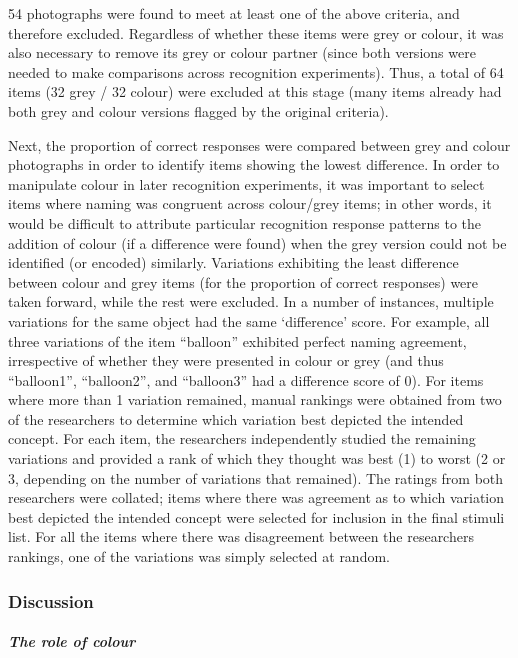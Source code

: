 \documentclass[
  11pt,
]{article}
\begin{document}
54 photographs were found to meet at least one of the above criteria,
and therefore excluded. Regardless of whether these items were grey or
colour, it was also necessary to remove its grey or colour partner
(since both versions were needed to make comparisons across recognition
experiments). Thus, a total of 64 items (32 grey / 32 colour) were
excluded at this stage (many items already had both grey and colour
versions flagged by the original criteria).

Next, the proportion of correct responses were compared between grey and
colour photographs in order to identify items showing the lowest
difference. In order to manipulate colour in later recognition
experiments, it was important to select items where naming was congruent
across colour/grey items; in other words, it would be difficult to
attribute particular recognition response patterns to the addition of
colour (if a difference were found) when the grey version could not be
identified (or encoded) similarly. Variations exhibiting the least
difference between colour and grey items (for the proportion of correct
responses) were taken forward, while the rest were excluded. In a number
of instances, multiple variations for the same object had the same
`difference' score. For example, all three variations of the item
``balloon'' exhibited perfect naming agreement, irrespective of whether
they were presented in colour or grey (and thus ``balloon1'',
``balloon2'', and ``balloon3'' had a difference score of 0). For items
where more than 1 variation remained, manual rankings were obtained from
two of the researchers to determine which variation best depicted the
intended concept. For each item, the researchers independently studied
the remaining variations and provided a rank of which they thought was
best (1) to worst (2 or 3, depending on the number of variations that
remained). The ratings from both researchers were collated; items where
there was agreement as to which variation best depicted the intended
concept were selected for inclusion in the final stimuli list. For all
the items where there was disagreement between the researchers rankings,
one of the variations was simply selected at random.

\hypertarget{discussion-1}{%
\subsubsection{Discussion}\label{discussion-1}}

\hypertarget{the-role-of-colour}{%
\paragraph{\texorpdfstring{\emph{The role of
colour}}{The role of colour}}\label{the-role-of-colour}}
\end{document}
